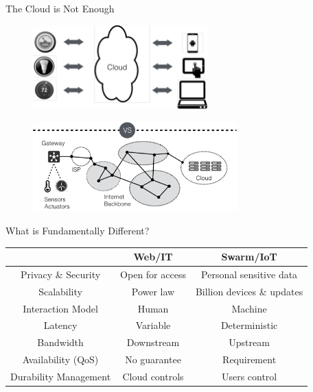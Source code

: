 \begin{frame}{The Cloud is Not Enough}
  \begin{figure}
    \includegraphics[width=0.6\textwidth]{figures/cloud-view.pdf}
  \end{figure}
  \vspace{-3em}
  \pause
  \begin{figure}
    \includegraphics[width=0.7\textwidth]{figures/cloud-reality.pdf}
  \end{figure}
\end{frame}

\begin{frame}{What is Fundamentally Different?}

  \begin{table}
    \centering
    \begin{tabular}{c c c}
      \toprule
      & Web/IT & Swarm/IoT \\
      \midrule
      Privacy \& Security & Open for access & Personal sensitive data \\
      Scalability & Power law & Billion devices \& updates \\
      Interaction Model & Human & Machine \\
      Latency & Variable & Deterministic  \\
      Bandwidth & Downstream & Upstream   \\
      Availability (QoS) & No guarantee & Requirement  \\
      Durability Management & Cloud controls & Users control \\
      \bottomrule
    \end{tabular}
  \end{table}

\end{frame}

